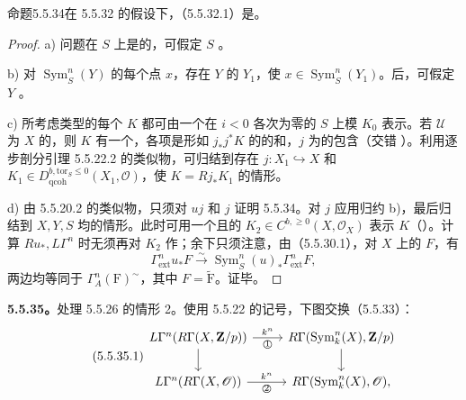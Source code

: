 \begin{SGAresult}{命题}{5.5.34}在 5.5.32 的假设下，（5.5.32.1）是。\end{SGAresult}
\begin{proof}
a) 问题在 $S$ 上是的，可假定 $S$ 。

b) 对 $\operatorname{Sym}^n_S(Y)$ 的每个点 $x$，存在 $Y$ 的 $Y_1$，使 $x\in\operatorname{Sym}^n_S(Y_1)$。后，可假定 $Y$ 。

c) 所考虑类型的每个 $K$ 都可由一个在 $i<0$ 各次为零的 $S$ 上模 $K_0$ 表示。若 $\mathscr U$ 为 $X$ 的，则 $K$ 有一个，各项是形如 $j_*j^*K$ 的的和，$j$ 为的包含（交错 ）。利用逐步剖分引理 5.5.22.2 的类似物，可归结到存在 $j:X_1\hookrightarrow X$ 和 $K_1\in D^{b,\mathrm{tor}_S\leq0}_{\mathrm{qcoh}}(X_1,\mathscr O)$，使 $K=Rj_*K_1$ 的情形。

d) 由 5.5.20.2 的类似物，只须对 $uj$ 和 $j$ 证明 5.5.34。对 $j$ 应用归约 b)，最后归结到 $X,Y,S$ 均的情形。此时可用一个且的 $K_2\in C^{b,\geq0}(X,\mathscr O_X)$ 表示 $K$（）。计算 $Ru_*,L\Gamma^n$ 时无须再对 $K_2$ 作；余下只须注意，由（5.5.30.1），对 $X$ 上的 $F$，有
\[\Gamma^n_{\mathrm{ext}}u_*F\xrightarrow\sim\operatorname{Sym}^n_S(u)_*\Gamma^n_{\mathrm{ext}}F,\]
两边均等同于 $\Gamma^n_A(\mathrm F)^{\sim}$，其中 $F=\widetilde{\mathrm F}$。证毕。
\end{proof}
\textbf{5.5.35。}处理 5.5.26 的情形 2。使用 5.5.22 的记号，下图交换（5.5.33）：
\begin{equation}\tag{5.5.35.1}\begin{tikzcd}
L\Gamma^n(R\Gamma(X,\mathbf Z/p))\arrow[r,"k^n","\text{\textcircled{1}}"']\arrow[d]&R\Gamma(\operatorname{Sym}^n_k(X),\mathbf Z/p)\arrow[d]\\
L\Gamma^n(R\Gamma(X,\mathscr O))\arrow[r,"k^n","\text{\textcircled{2}}"']&R\Gamma(\operatorname{Sym}^n_k(X),\mathscr O),
\end{tikzcd}\end{equation}
